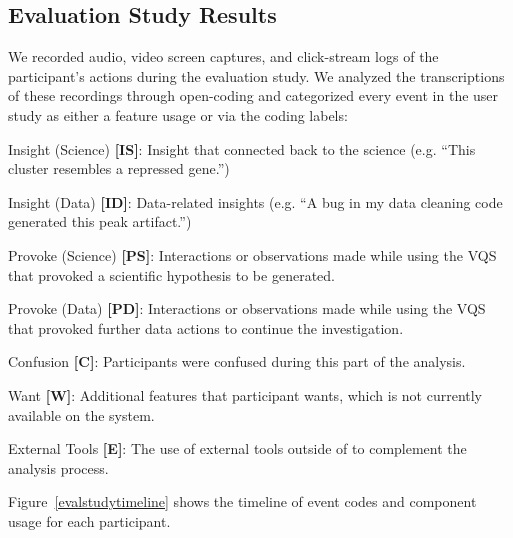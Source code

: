 \subsection{Evaluation Study Results\label{eval_findings}}
We recorded audio, video screen captures, and click-stream logs of the participant's actions during the evaluation study. We analyzed the transcriptions of these recordings through open-coding and categorized every event in the user study as either a feature usage or via the coding labels:
\begin{denselist}
    \item Insight (Science) \textbf{[IS]}: Insight that connected back to the science (e.g. ``This cluster resembles a repressed gene.'')
    \item Insight (Data) \textbf{[ID]}: Data-related insights (e.g. ``A bug in my data cleaning code generated this peak artifact.'')
    \item Provoke (Science) \textbf{[PS]}: Interactions or observations made while using the VQS that provoked a scientific hypothesis to be generated.
    \item Provoke (Data) \textbf{[PD]}: Interactions or observations made while using the VQS that provoked further data actions to continue the investigation.
    \item Confusion \textbf{[C]}: Participants were confused during this part of the analysis.
    \item Want \textbf{[W]}: Additional features that participant wants, which is not currently available on the system.
    \item External Tools \textbf{[E]}: The use of external tools outside of \zv to complement the analysis process.
\end{denselist}
Figure~\ref{evalstudytimeline} shows the timeline of event codes and component usage for each participant.

